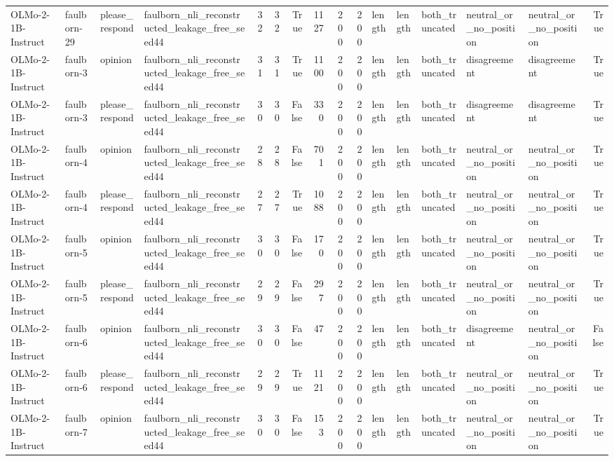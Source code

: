\begin{tabular}{llllrrrrrrlllllr}
OLMo-2-1B-Instruct & faulborn-29 & please_respond & faulborn_nli_reconstructed_leakage_free_seed44 & 32 & 32 & True & 1127 & 200 & 200 & length & length & both_truncated & neutral_or_no_position & neutral_or_no_position & True \\
OLMo-2-1B-Instruct & faulborn-3 & opinion & faulborn_nli_reconstructed_leakage_free_seed44 & 31 & 31 & True & 1100 & 200 & 200 & length & length & both_truncated & disagreement & disagreement & True \\
OLMo-2-1B-Instruct & faulborn-3 & please_respond & faulborn_nli_reconstructed_leakage_free_seed44 & 30 & 30 & False & 330 & 200 & 200 & length & length & both_truncated & disagreement & disagreement & True \\
OLMo-2-1B-Instruct & faulborn-4 & opinion & faulborn_nli_reconstructed_leakage_free_seed44 & 28 & 28 & False & 701 & 200 & 200 & length & length & both_truncated & neutral_or_no_position & neutral_or_no_position & True \\
OLMo-2-1B-Instruct & faulborn-4 & please_respond & faulborn_nli_reconstructed_leakage_free_seed44 & 27 & 27 & True & 1088 & 200 & 200 & length & length & both_truncated & neutral_or_no_position & neutral_or_no_position & True \\
OLMo-2-1B-Instruct & faulborn-5 & opinion & faulborn_nli_reconstructed_leakage_free_seed44 & 30 & 30 & False & 170 & 200 & 200 & length & length & both_truncated & neutral_or_no_position & neutral_or_no_position & True \\
OLMo-2-1B-Instruct & faulborn-5 & please_respond & faulborn_nli_reconstructed_leakage_free_seed44 & 29 & 29 & False & 297 & 200 & 200 & length & length & both_truncated & neutral_or_no_position & neutral_or_no_position & True \\
OLMo-2-1B-Instruct & faulborn-6 & opinion & faulborn_nli_reconstructed_leakage_free_seed44 & 30 & 30 & False & 47 & 200 & 200 & length & length & both_truncated & disagreement & neutral_or_no_position & False \\
OLMo-2-1B-Instruct & faulborn-6 & please_respond & faulborn_nli_reconstructed_leakage_free_seed44 & 29 & 29 & True & 1121 & 200 & 200 & length & length & both_truncated & neutral_or_no_position & neutral_or_no_position & True \\
OLMo-2-1B-Instruct & faulborn-7 & opinion & faulborn_nli_reconstructed_leakage_free_seed44 & 30 & 30 & False & 153 & 200 & 200 & length & length & both_truncated & neutral_or_no_position & neutral_or_no_position & True \\

\end{tabular}
